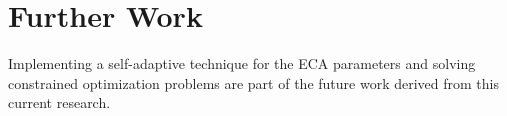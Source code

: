 \documentclass{svproc}
\begin{document}

\clearpage
\section{Further Work} %
\label{sec:further_work}

Implementing a self-adaptive technique for the ECA parameters and solving 
constrained optimization problems are part of the future work derived 
from this current research. 




\end{document}
